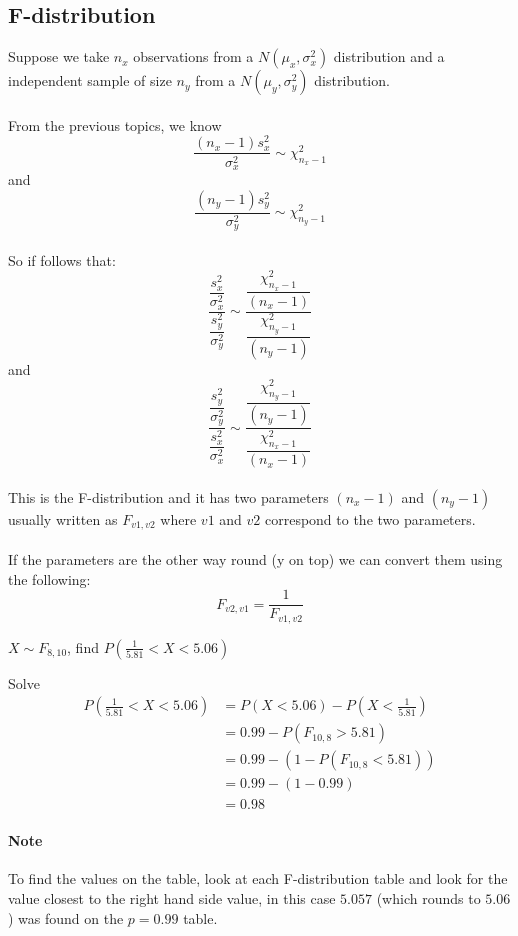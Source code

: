     \subsection{F-distribution}
        Suppose we take $n_x$ observations from a $N(\mu_x, \sigma_x^2)$ distribution and a independent sample of size $n_y$ from a $N(\mu_y, \sigma_y^2)$ distribution.\\
        \\
        From the previous topics, we know $$\frac{(n_x-1)s_x^2}{\sigma_x^2} \sim \chi^2_{n_x-1}$$ and $$\frac{(n_y-1)s_y^2}{\sigma_y^2} \sim \chi^2_{n_y-1}$$
        \\
        So if follows that: 
        $$
        \dfrac{\dfrac{s_x^2}{\sigma_x^2}}{\dfrac{s_y^2}{\sigma_y^2}} 
        \sim 
        \dfrac{\dfrac{\chi^2_{n_x-1}}{(n_x-1)}}{\dfrac{\chi^2_{n_y-1}}{(n_y-1)}}
        $$ 
        and 
        $$ 
        \dfrac{\dfrac{s_y^2}{\sigma_y^2}}{\dfrac{s_x^2}{\sigma_x^2}} 
        \sim 
        \dfrac{\dfrac{\chi^2_{n_y-1}}{(n_y-1)}}{\dfrac{\chi^2_{n_x-1}}{(n_x-1)}} 
        $$
        \\
        This is the F-distribution and it has two parameters $(n_x - 1)$ and $(n_y - 1)$ usually written as $F_{v1, v2}$ where $v1$ and $v2$ correspond to the two parameters.\\
        \\
        If the parameters are the other way round (y on top) we can convert them using the following: 
        $$ F_{v2, v1} = \frac{1}{F_{v1, v2}} $$

        \begin{example}
        {
            $X \sim F_{8, 10}$, find $P(\frac{1}{5.81} < X < 5.06)$
        }

        \begin{step}{Solve}
        \begin{align*} 
        P(\frac{1}{5.81} < X < 5.06) &= P(X < 5.06) - P(X < \frac{1}{5.81})\\ 
        &= 0.99 - P(F_{10, 8} > 5.81)\\ 
        &= 0.99 - (1 - P(F_{10, 8} < 5.81))\\ 
        &= 0.99 - (1 - 0.99)\\ 
        &= 0.98 
        \end{align*}         
        \end{step}

        \end{example}
        \paragraph{Note}
        To find the values on the table, look at each F-distribution table and look for the value closest to the right hand side value, in this case $5.057$ (which rounds to $5.06$) was found on the $p = 0.99$ table.

